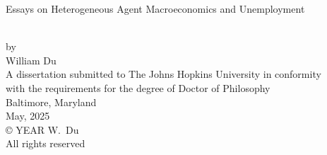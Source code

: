 \thispagestyle{empty}
\baselineskip=18pt
\begin{center}
\vspace*{3\baselineskip}
%
{\bfseries \begin{large}Essays on Heterogeneous Agent Macroeconomics and Unemployment\end{large}}\\[6\baselineskip]
%
by\\
%
William Du\\[3\baselineskip]
%
%
A dissertation submitted to The Johns Hopkins University in conformity\\
with the requirements for the degree of Doctor of Philosophy\\[4\baselineskip]
%
Baltimore, Maryland\\
May, 2025\\[6\baselineskip]
%
{\copyright{} YEAR W.~Du\\
All rights reserved}
%
\end{center}
%
\baselineskip=24pt
\newpage 
